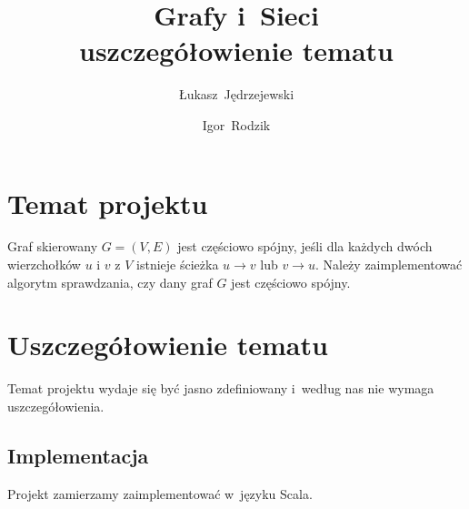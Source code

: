 \documentclass[a4paper,12pt]{mwart}
\title{
	Grafy i~Sieci \\
    uszczegółowienie tematu
}
\author{
	Łukasz~Jędrzejewski
    \and
	Igor~Rodzik
}
\date{}
\begin{document}
\maketitle

\section{Temat projektu}

Graf skierowany $G=(V,E)$ jest częściowo spójny, jeśli dla każdych dwóch
wierzchołków $u$ i $v$ z $V$ istnieje ścieżka $u \to v$ lub $v \to u$. Należy
zaimplementować algorytm sprawdzania, czy dany graf $G$ jest częściowo spójny.

\section{Uszczegółowienie tematu}

Temat projektu wydaje się być jasno zdefiniowany i~według nas nie wymaga
uszczegółowienia.

\subsection{Implementacja}

Projekt zamierzamy zaimplementować w~języku Scala.
\end{document}
